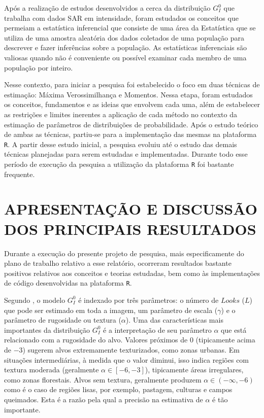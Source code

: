 \documentclass[12pt]{article}
\begin{document}
Após a realização de estudos desenvolvidos a cerca da distribuição $G_I^0$ que trabalha com dados SAR em intensidade, foram estudados os conceitos que permeiam a estatística inferencial que consiste de uma área da Estatística que se utiliza de uma amostra aleatória dos dados coletados de uma população para descrever e fazer inferências sobre a população. As estatísticas inferenciais são valiosas quando não é conveniente ou possível examinar cada membro de uma população por inteiro.

Nesse contexto, para iniciar a pesquisa foi estabelecido o foco em duas técnicas de estimação: Máxima Verossimilhança e Momentos. Nessa etapa, foram estudados os conceitos, fundamentos e as ideias que envolvem cada uma, além de estabelecer as restrições e limites inerentes a aplicação de cada método no contexto da estimação de parâmetros de distribuições de probabilidade. Após o estudo teórico de ambas as técnicas, partiu-se para a implementação das mesmas na plataforma \texttt{R}. A partir desse estudo inicial, a pesquisa evoluiu até o estudo das demais técnicas planejadas para serem estudadas e implementadas. Durante todo esse período de execução da pesquisa a utilização da plataforma \texttt{R} foi bastante frequente.



\newpage
\section*{\centering \textbf{APRESENTAÇÃO E DISCUSSÃO DOS PRINCIPAIS RESULTADOS}}
\vspace{0.5cm}

Durante a execução do presente projeto de pesquisa, mais especificamente do plano de trabalho relativo a esse relatório, ocorreram resultados bastante positivos relativos aos conceitos e teorias estudadas, bem como às implementações de código desenvolvidas na plataforma \texttt{R}. 

Segundo \citet{FreryStochasticDistances2015}, o modelo $G_I^0$ é indexado por três parâmetros: o número de $Looks$ ($L$) que pode ser estimado em toda a imagem, um parâmetro de escala ($\gamma$) e o parâmetro de rugosidade ou textura ($\alpha$). Uma das características mais importantes da distribuição $G_I^0$ é a interpretação de seu parâmetro $\alpha$ que está relacionado com a rugosidade do alvo. Valores próximos de $0$ (tipicamente acima de $-3$) sugerem alvos extremamente texturizados, como zonas urbanas. Em situações intermediárias, à medida que o valor diminui, isso indica regiões com textura moderada (geralmente $\alpha \in  [−6, −3]$), tipicamente áreas irregulares, como zonas florestais. Alvos sem textura, geralmente produzem $\alpha \in (−\infty, −6)$ como é o caso de regiões lisas, por exemplo, pastagem, culturas e campos queimados. Esta é a razão pela qual a precisão na estimativa de $\alpha$ é tão importante.
\end{document}
